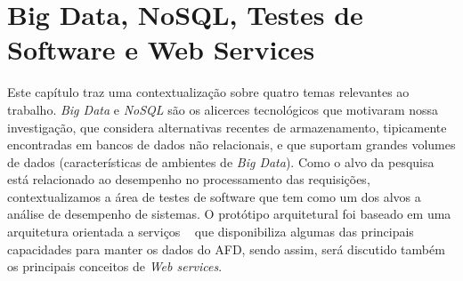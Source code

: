 \chapter{Big Data, NoSQL, Testes de Software e Web Services}

Este capítulo traz uma contextualização sobre quatro temas relevantes ao trabalho. \emph{Big Data} e \emph{NoSQL} são os alicerces tecnológicos que motivaram nossa investigação, que considera alternativas recentes de armazenamento, tipicamente encontradas em bancos de dados não relacionais, e que suportam grandes volumes de dados (características de ambientes de \emph{Big Data}). Como o alvo da pesquisa está relacionado ao desempenho no processamento das requisições, contextualizamos a área de testes de software que tem como um dos alvos a análise de desempenho de sistemas. O protótipo arquitetural foi baseado em uma arquitetura orientada a serviços ~\cite{erl:2007} que disponibiliza algumas das principais capacidades para manter os dados do AFD, sendo assim, será discutido também os principais conceitos de \textit{Web services}.







   